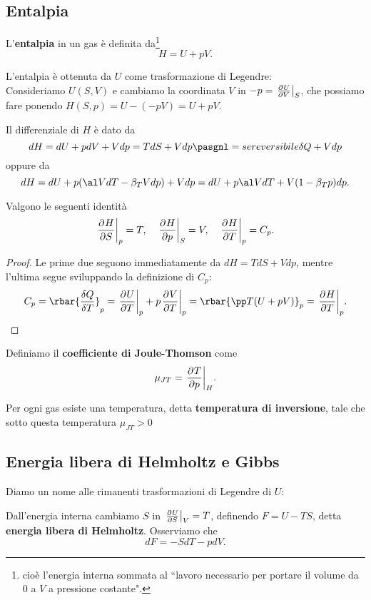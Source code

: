 \subsection{Entalpia}



\begin{definition}[Entalpia]
L'\textbf{entalpia} in un gas \`e definita da\footnote{cio\`e l'energia interna sommata al ``lavoro necessario per portare il volume da $0$ a $V$ a pressione costante".}
\[H=U+pV.\]
\end{definition}

\begin{remark}
L'entalpia \`e ottenuta da $U$ come trasformazione di Legendre:\\
Consideriamo $U(S,V)$ e cambiamo la coordinata $V$ in $-p=\ppb VUS$, che possiamo fare ponendo $H(S,p)=U-(-pV)=U+pV$.
\end{remark}

\begin{remark}
Il differenziale di $H$ \`e dato da
\[dH=dU+pdV+Vdp=TdS+Vdp\pasgnl={se reversibile}\delta Q+Vdp\]
oppure da
\[dH=dU+p(\al VdT-\beta_T Vdp)+Vdp=dU+p\al VdT+V(1-\beta_Tp)dp.\]
\end{remark}
\begin{corollary}
Valgono le seguenti identit\`a
\[\ppb SHp=T,\quad \ppb pHS=V,\quad \ppb THp=C_p.\]
\end{corollary}
\begin{proof}
Le prime due seguono immediatamente da $dH=TdS+Vdp$, mentre l'ultima segue sviluppando la definizione di $C_p$:
\[C_p=\rbar{\frac{\delta Q}{\delta T}}_p=\ppb TUp+p\ppb TVp=\rbar{\pp T{}(U+pV)}_p=\ppb THp.\]
\end{proof}




\begin{definition}
Definiamo il \textbf{coefficiente di Joule-Thomson} come
\[\mu_{JT}=\ppb pTH.\]
\end{definition}
\begin{fact}
Per ogni gas esiste una temperatura, detta \textbf{temperatura di inversione}, tale che sotto questa temperatura $\mu_{JT}>0$
\end{fact}




\subsection{Energia libera di Helmholtz e Gibbs}
\noindent
Diamo un nome alle rimanenti trasformazioni di Legendre di $U$:
\begin{definition}
Dall'energia interna cambiamo $S$ in $\ppb SUV=T$, definendo $F=U-TS$, detta \textbf{energia libera di Helmholtz}. Osserviamo che
\[dF=-SdT-pdV.\]
\end{definition}

